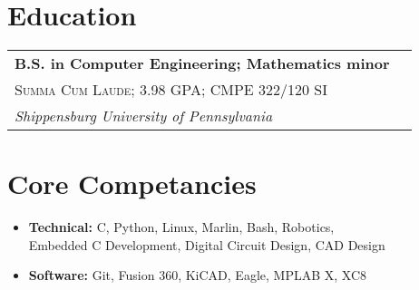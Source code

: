 \documentclass[
	10pt, %
]{FreemanCV}
\begin{document}
\begin{paracol}{2}

\section{Education} 


\begin{supertabular}{l l} %

	
	\textbf{B.S. in Computer Engineering; Mathematics minor}\\ %
	\small\textsc{Summa Cum Laude; 3.98 GPA; CMPE 322/120 SI}\\ %
	\textit{Shippensburg University of Pennsylvania}\\ %
	

\end{supertabular}

\switchcolumn

\section{Core Competancies}

\begin{itemize}[leftmargin=10pt]
	\itemsep0pt
	\item \textbf{Technical:} C, Python, Linux, Marlin, Bash, Robotics,\\
	\hspace*{0pt}Embedded C Development, Digital Circuit Design, CAD Design
	\item \textbf{Software:} Git, Fusion 360, KiCAD, Eagle, MPLAB X, XC8
\end{itemize}



\end{paracol}
\end{document}
